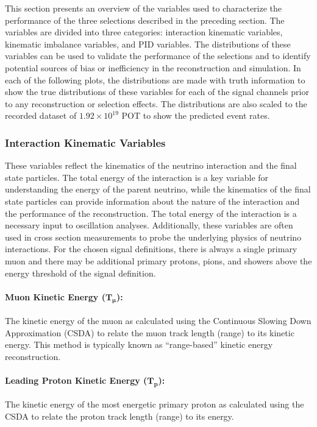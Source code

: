 This section presents an overview of the variables used to characterize the performance of the three selections described in the preceding section. The variables are divided into three categories: interaction kinematic variables, kinematic imbalance variables, and PID variables. The distributions of these variables can be used to validate the performance of the selections and to identify potential sources of bias or inefficiency in the reconstruction and simulation. In each of the following plots, the distributions are made with truth information to show the true distributions of these variables for each of the signal channels prior to any reconstruction or selection effects. The distributions are also scaled to the recorded dataset of $1.92 \times 10^{19}$ POT to show the predicted event rates.

\subsubsection{Interaction Kinematic Variables}
\label{sec:interaction_kinematic_variables}
These variables reflect the kinematics of the neutrino interaction and the final state particles. The total energy of the interaction is a key variable for understanding the energy of the parent neutrino, while the kinematics of the final state particles can provide information about the nature of the interaction and the performance of the reconstruction. The total energy of the interaction is a necessary input to oscillation analyses. Additionally, these variables are often used in cross section measurements to probe the underlying physics of neutrino interactions. For the chosen signal definitions, there is always a single primary muon and there may be additional primary protons, pions, and showers above the energy threshold of the signal definition. 

\paragraph{Muon Kinetic Energy ($\mathbf{T_\mu}$):}
The kinetic energy of the muon as calculated using the Continuous Slowing Down Approximation (CSDA) \cite{Zyla2020} to relate the muon track length (range) to its kinetic energy. This method is typically known as ``range-based'' kinetic energy reconstruction.

\paragraph{Leading Proton Kinetic Energy ($\mathbf{T_p}$):}
The kinetic energy of the most energetic primary proton as calculated using the CSDA to relate the proton track length (range) to its energy.
    
